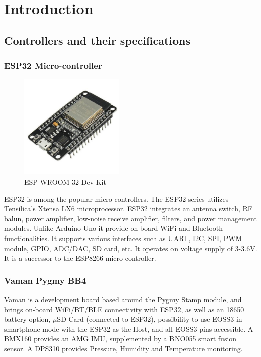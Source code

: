 \chapter{Introduction} \label{chap:intro}

\section{Controllers and their specifications}

\subsection{ESP32 Micro-controller}

\begin{figure}[h!]
\centering
\includegraphics[width=5cm]{./Figures/ESP32.jpg}
\caption{ESP-WROOM-32 Dev Kit}
\label{ESP32}
\end{figure}

ESP32 is among the popular micro-controllers. The ESP32 series utilizes Tensilica's Xtensa LX6 microprocessor. ESP32 integrates an antenna switch, RF balun, power amplifier, low-noise receive amplifier, filters,
and power management modules. Unlike Arduino Uno it provide on-board WiFi and Bluetooth functionalities. It supports various interfaces such as  UART, I2C, SPI, PWM module, GPIO, ADC/DAC, SD card, etc. It operates on voltage supply of 3-3.6V. It is a successor to the ESP8266 micro-controller.~\cite{esp32}

\subsection{Vaman Pygmy BB4} 
\par Vaman is a development board based around the Pygmy Stamp module, and brings on-board WiFi/BT/BLE connectivity with ESP32, as well as an 18650 battery option, $\mu$SD Card (connected to ESP32), possibility to use EOSS3 in smartphone mode with the ESP32 as the Host, and all EOSS3 pins accessible. A BMX160 provides an AMG IMU, supplemented by a BNO055 smart fusion sensor. A DPS310 provides Pressure, Humidity and Temperature monitoring.~\cite{Vaman}

